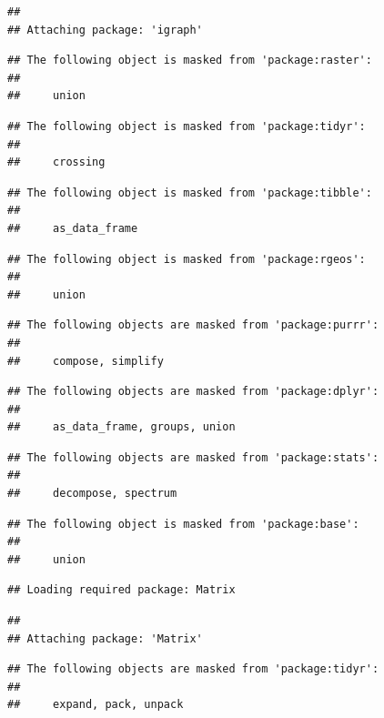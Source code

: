 \documentclass[]{elsarticle} %
\begin{document}
\begin{verbatim}
## 
## Attaching package: 'igraph'
\end{verbatim}

\begin{verbatim}
## The following object is masked from 'package:raster':
## 
##     union
\end{verbatim}

\begin{verbatim}
## The following object is masked from 'package:tidyr':
## 
##     crossing
\end{verbatim}

\begin{verbatim}
## The following object is masked from 'package:tibble':
## 
##     as_data_frame
\end{verbatim}

\begin{verbatim}
## The following object is masked from 'package:rgeos':
## 
##     union
\end{verbatim}

\begin{verbatim}
## The following objects are masked from 'package:purrr':
## 
##     compose, simplify
\end{verbatim}

\begin{verbatim}
## The following objects are masked from 'package:dplyr':
## 
##     as_data_frame, groups, union
\end{verbatim}

\begin{verbatim}
## The following objects are masked from 'package:stats':
## 
##     decompose, spectrum
\end{verbatim}

\begin{verbatim}
## The following object is masked from 'package:base':
## 
##     union
\end{verbatim}

\begin{verbatim}
## Loading required package: Matrix
\end{verbatim}

\begin{verbatim}
## 
## Attaching package: 'Matrix'
\end{verbatim}

\begin{verbatim}
## The following objects are masked from 'package:tidyr':
## 
##     expand, pack, unpack
\end{verbatim}
\end{document}
